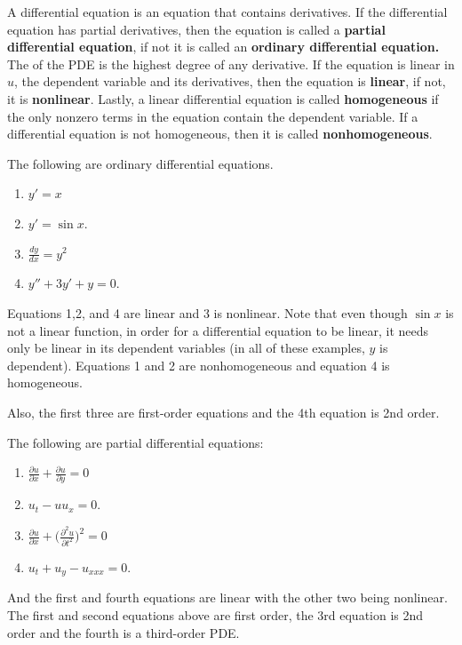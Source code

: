 \begin{definition}
A differential equation is an equation that contains derivatives.  If the differential equation has partial derivatives, then the equation is called a  \textbf{partial differential equation}, if not it is called an \textbf{ordinary differential equation.}  The  of the PDE is the highest degree of any derivative.  If the equation is linear in $u$, the dependent variable and its derivatives, then the equation is \textbf{linear}, if not, it is \textbf{nonlinear}.   Lastly, a linear differential equation is called \textbf{homogeneous} if the only nonzero terms in the equation contain the dependent variable.  If a differential equation is not homogeneous, then it is called \textbf{nonhomogeneous}.
\end{definition}

\begin{example}
The following are ordinary differential equations.

\begin{enumerate}
\item $\displaystyle y' = x$
\item $\displaystyle y' = \sin x$.
\item $\displaystyle \frac{dy}{dx}  = y^2$
\item $\displaystyle y'' + 3y' + y = 0 $.
\end{enumerate}

Equations 1,2, and 4 are linear and 3 is nonlinear.  Note that even though $\sin x$ is not a linear function, in order for a differential equation to be linear, it needs only be linear in its dependent variables (in all of these examples, $y$ is dependent).   Equations 1 and 2 are nonhomogeneous and equation 4 is homogeneous.

Also, the first three are first-order equations and the 4th equation is 2nd order.


The following are partial differential equations:
\begin{enumerate}
\item $\displaystyle \frac{\partial u}{\partial x} + \frac{\partial u}{\partial y} = 0$
\item $\displaystyle u_{t} -u  u_x = 0$.
\item $\displaystyle \frac{\partial u}{\partial x} + \biggl(\frac{\partial^2 u}{\partial {t}^2}    \biggr)^2  = 0 $
\item $\displaystyle u_{t} +u_y - u_{xxx} = 0$.
\end{enumerate}

And the first and fourth equations are linear with the other two being nonlinear.  The first and second equations above are first order, the 3rd equation is 2nd order and the fourth is a third-order PDE.


\end{example}

